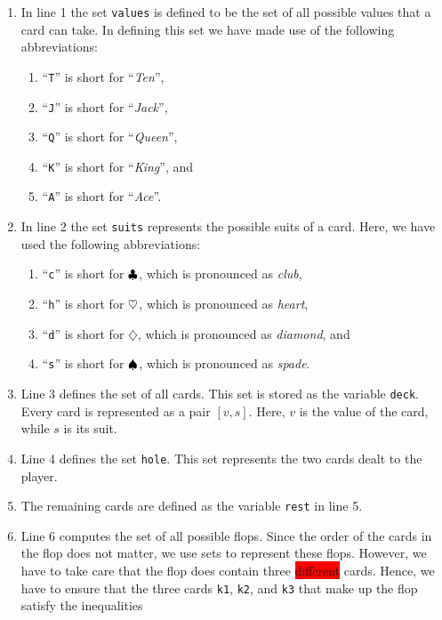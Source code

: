 \begin{enumerate}
\item In line 1 the set \texttt{values} is defined to be the set of all possible values that a card
      can take.  In defining this set we have made use of the following abbreviations:
      \begin{enumerate}
      \item ``\texttt{T}'' is short for ``\emph{Ten}'',
      \item ``\texttt{J}'' is short for ``\emph{Jack}'',
      \item ``\texttt{Q}'' is short for ``\emph{Queen}'',
      \item ``\texttt{K}'' is short for ``\emph{King}'', and
      \item ``\texttt{A}'' is short for ``\emph{Ace}''.
      \end{enumerate}
\item In line 2 the set \texttt{suits} represents the possible suits of a card.  Here, we have used
      the following abbreviations:
      \begin{enumerate}
      \item ``\texttt{c}'' is short for $\clubsuit $, which is pronounced as \emph{club},
      \item ``\texttt{h}'' is short for $\heartsuit $, which is pronounced as \emph{heart}, 
      \item ``\texttt{d}'' is short for $\diamondsuit$, which is pronounced as \emph{diamond}, and 
      \item ``\texttt{s}'' is short for $\spadesuit $, which is pronounced as \emph{spade}. 
      \end{enumerate} 
\item Line 3 defines the set of all cards.  This set is stored as the variable \texttt{deck}.  Every
      card is represented as a pair $[v,s]$. Here, $v$ is the value of the card, while $s$ is its suit.
\item Line 4 defines the set \texttt{hole}.  This set represents the two cards dealt to the player.
\item The remaining cards are defined as the variable  \texttt{rest} in line 5.
\item Line 6 computes the set of all possible flops.  Since the order of the cards in the flop does
      not matter, we use sets to represent these flops.  However, we have to take care that the flop
      does contain three \colorbox{red}{different} cards.  Hence, we have to ensure that the three
      cards \texttt{k1}, \texttt{k2}, and \texttt{k3} that make up the flop satisfy the inequalities 

\end{enumerate}
